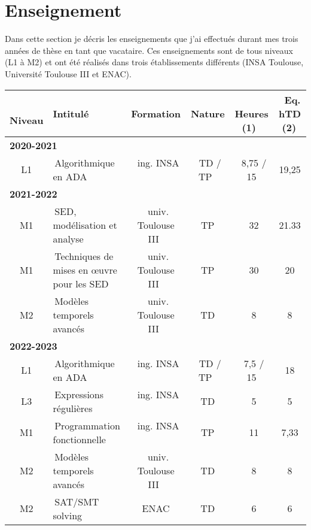 \label{sec:enseignements}


\vspace{10pt}
\section*{Enseignement}\label{sec:tab}
\vspace{10pt}

Dans cette section je décris les enseignements que j'ai effectués durant mes trois
années de thèse en tant que vacataire. Ces enseignements sont de tous niveaux
(L1 à M2) et ont été réalisés dans trois établissements différents (INSA
Toulouse, Université Toulouse III et ENAC).\\

{\small
\begin{tabular}{c @{\quad} p{13em} @{\qquad} c c c c}
\toprule
\, Niveau  & Intitulé &Formation& Nature &   \, Heures (1) \, & \, Eq. hTD (2)\,  \\
\midrule
\multicolumn{6}{l}{\textbf{2020-2021}}\\
\, L1 \,& \,Algorithmique en ADA \,&\, ing. INSA  \,&\,  TD / TP \,&\, 8,75 / 15 & 19,25\\
\midrule
\multicolumn{6}{l}{\textbf{2021-2022}}\\
\, M1 \,& \,SED, modélisation et analyse \,&\, univ. Toulouse III  \,&\,  TP \,&\, 32 & 21.33\\
\, M1 \,& \,Techniques de mises en œuvre pour les SED\,&\, univ. Toulouse III  \,&\,  TP \,&\, 30 & 20\\
\, M2 \,& \,Modèles temporels avancés \,&\, univ. Toulouse III  \,&\,  TD \,&\, 8 & 8\\
\midrule
\multicolumn{6}{l}{\textbf{2022-2023}}\\
\, L1 \,& \,Algorithmique en ADA \,&\, ing. INSA  \,&\,  TD / TP \,&\, 7,5 / 15 & 18\\
\, L3 \,& \,Expressions régulières \,&\, ing. INSA  \,&\,  TD \,&\, 5 & 5\\
\, M1 \,& \,Programmation fonctionnelle \,&\, ing. INSA  \,&\,  TP \,&\, 11 & 7,33\\
\, M2 \,& \,Modèles temporels avancés \,&\, univ. Toulouse III  \,&\,  TD \,&\, 8 & 8\\
\, M2 \,& \,SAT/SMT solving \,&\, ENAC \,&\,  TD \,&\, 6& 6\\
\bottomrule
\end{tabular}
}
\medbreak

